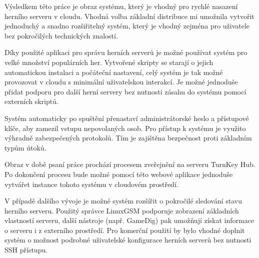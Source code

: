 \begin{conclusion}
    Výsledkem této práce je obraz systému, který je vhodný pro rychlé nasazení herního serveru v cloudu.
    Vhodná volba základní distribuce mi umožnila vytvořit jednoduchý a snadno rozšiřitelný systém,
    který je vhodný zejména pro uživatele bez pokročilých technických znalostí.

    Díky použité aplikaci pro správu herních serverů je možné používat systém pro velké množství populárních her.
    Vytvořené skripty se starají o jejich automatickou instalaci a počáteční nastavení, celý systém je tak
    možné provozovat v cloudu s minimální uživatelskou interakcí. Je možné jednoduše přidat podporu pro
    další herní servery bez nutnosti zásahu do systému pomocí externích skriptů.

    Systém automaticky po spuštění přenastaví administrátorské heslo a přístupové klíče, aby zamezil vstupu
    nepovolaných osob. Pro přístup k systému je využito výhradně zabezpečených protokolů.
    Tím je zajištěna bezpečnost proti základním typům útoků.

    Obraz v době psaní práce prochází procesem zveřejnění na serveru \mbox{TurnKey} Hub. Po dokončení procesu
    bude možné pomocí této webové aplikace jednoduše vytvářet instance tohoto systému v cloudovém prostředí.

    V případě dalšího vývoje je možné systém rozšířit o pokročilé sledování stavu herního serveru. Použitý správce LinuxGSM podporuje
    zobrazení základních vlastností serveru, další nástroje (např. GameDig) pak umožňují získat informace o serveru i z externího
    prostředí. Pro komerční použití by bylo vhodné doplnit systém o možnost podrobné uživatelské konfigurace herních serverů bez nutnosti SSH přístupu.
\end{conclusion}
